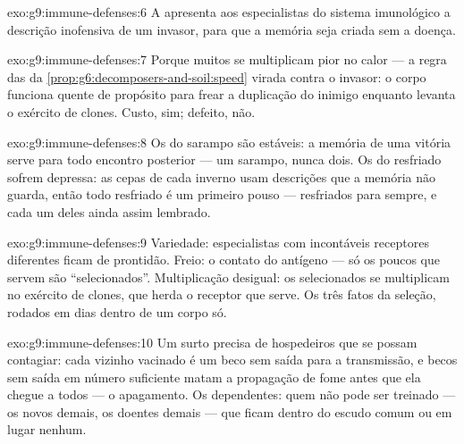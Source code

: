 \begin{solution}{exo:g9:immune-defenses:6}
A  apresenta aos especialistas do sistema
imunológico a descrição inofensiva de um invasor, para que a
memória seja criada sem a doença.
\end{solution}

\begin{solution}{exo:g9:immune-defenses:7}
Porque muitos  se multiplicam pior no calor --- a
regra das  da
\cref{prop:g6:decomposers-and-soil:speed} virada contra o
invasor: o corpo funciona quente de propósito para frear a
duplicação do inimigo enquanto levanta o exército de clones.
Custo, sim; defeito, não.
\end{solution}

\begin{solution}{exo:g9:immune-defenses:8}
Os  do sarampo são estáveis: a memória de uma
vitória serve para todo encontro posterior --- um sarampo,
nunca dois. Os  do resfriado sofrem  depressa: as
cepas de cada inverno usam descrições que a memória não
guarda, então todo resfriado é um primeiro pouso ---
resfriados para sempre, e cada um deles ainda assim lembrado.
\end{solution}

\begin{solution}{exo:g9:immune-defenses:9}
Variedade: especialistas com incontáveis receptores
diferentes ficam de prontidão. Freio: o contato do antígeno
--- só os poucos que servem são ``selecionados''.
Multiplicação desigual: os selecionados se multiplicam no
exército de clones, que herda o receptor que serve. Os três
fatos da seleção, rodados em dias dentro de um corpo só.
\end{solution}

\begin{solution}{exo:g9:immune-defenses:10}
Um surto precisa de hospedeiros que se possam contagiar: cada
vizinho vacinado é um beco sem saída para a transmissão, e
becos sem saída em número suficiente matam a propagação de
fome antes que ela chegue a todos --- o apagamento. Os
dependentes: quem não pode ser treinado --- os novos demais,
os doentes demais --- que ficam dentro do escudo comum ou em
lugar nenhum.
\end{solution}

